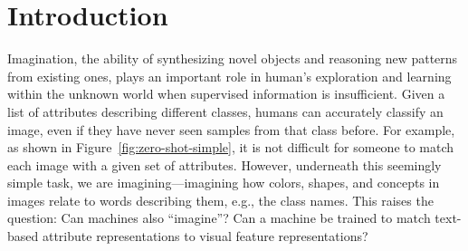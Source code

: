 \documentclass[letterpaper]{article} %
\begin{document}
\section{Introduction}
Imagination, the ability of synthesizing novel objects and reasoning new patterns from existing ones, plays an important role in human's exploration and learning within the unknown world when supervised information is insufficient. 
Given a list of attributes describing different classes, humans can accurately classify an image, even if they have never seen samples from that class before. 
For example, as shown in Figure~\ref{fig:zero-shot-simple}, it is not difficult for someone to match each image with a given set of attributes. 
However, underneath this seemingly simple task, we are imagining---imagining how colors, shapes, and concepts in images relate to words describing them, e.g., the class names. This raises the question: Can machines also ``imagine''? Can a machine be trained to match text-based attribute representations to visual feature representations? 
\end{document}
